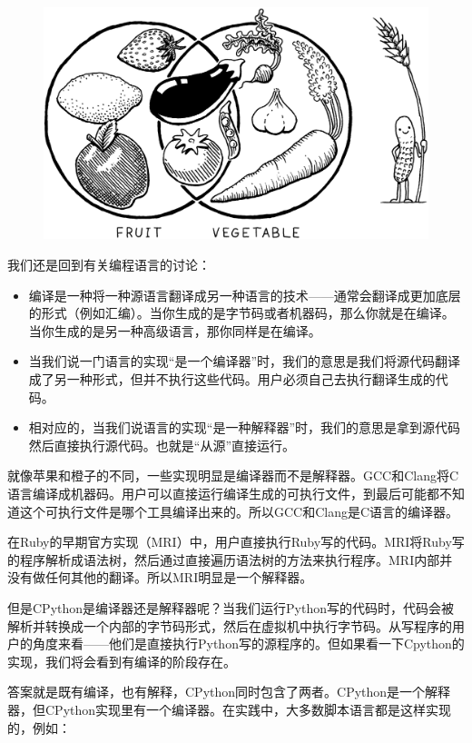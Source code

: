 \documentclass[cn,10pt,math=newtx,citestyle=gb7714-2015,bibstyle=gb7714-2015]{elegantbook}
\begin{document}
\begin{figure}[h]
\centering
\includegraphics[width=\textwidth]{./image/a-map-of-the-territory/plants.png}
\end{figure}

我们还是回到有关编程语言的讨论：

\begin{itemize}
\item 编译是一种将一种源语言翻译成另一种语言的技术——通常会翻译成更加底层的形式（例如汇编）。当你生成的是字节码或者机器码，那么你就是在编译。当你生成的是另一种高级语言，那你同样是在编译。
\item 当我们说一门语言的实现“是一个编译器”时，我们的意思是我们将源代码翻译成了另一种形式，但并不执行这些代码。用户必须自己去执行翻译生成的代码。
\item 相对应的，当我们说语言的实现“是一种解释器”时，我们的意思是拿到源代码然后直接执行源代码。也就是“从源”直接运行。
\end{itemize}

就像苹果和橙子的不同，一些实现明显是编译器而不是解释器。GCC和Clang将C语言编译成机器码。用户可以直接运行编译生成的可执行文件，到最后可能都不知道这个可执行文件是哪个工具编译出来的。所以GCC和Clang是C语言的编译器。

在Ruby的早期官方实现（MRI）中，用户直接执行Ruby写的代码。MRI将Ruby写的程序解析成语法树，然后通过直接遍历语法树的方法来执行程序。MRI内部并没有做任何其他的翻译。所以MRI明显是一个解释器。

但是CPython是编译器还是解释器呢？当我们运行Python写的代码时，代码会被解析并转换成一个内部的字节码形式，然后在虚拟机中执行字节码。从写程序的用户的角度来看——他们是直接执行Python写的源程序的。但如果看一下Cpython的实现，我们将会看到有编译的阶段存在。

答案就是既有编译，也有解释，CPython同时包含了两者。CPython是一个解释器，但CPython实现里有一个编译器。在实践中，大多数脚本语言都是这样实现的，例如：
\end{document}

